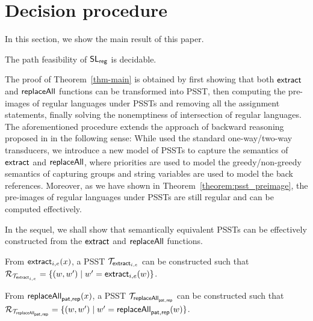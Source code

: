 
\section{Decision procedure} \label{sec:decision}

In this section, we  show the main result of this paper.

\begin{theorem}\label{thm-main}
The path feasibility of $\mathsf{SL}_{\sf reg}$ is decidable.
\end{theorem}

The proof of Theorem~\ref{thm-main} is obtained by first showing that both $\mathsf{extract}$ and $\mathsf{replaceAll}$ functions can be transformed into PSST, then computing the pre-images of regular languages under PSSTs and removing all the assignment statements, finally solving the nonemptiness of intersection of regular languages. The aforementioned procedure extends the approach of backward reasoning proposed in \cite{CCH+18,CHL+19} in the following sense: While \cite{CCH+18,CHL+19} used the standard one-way/two-way transducers, we introduce a new model of PSSTs to capture the semantics of $\mathsf{extract}$ and $\mathsf{replaceAll}$, where priorities are used to model the greedy/non-greedy semantics of capturing groups and string variables are used to model the back references. Moreover, as we have shown in Theorem~\ref{theorem:psst_preimage}, the pre-images of regular languages under PSSTs are still regular and can be computed effectively.

In the sequel, we shall show that semantically equivalent PSSTs can be effectively constructed from the $\mathsf{extract}$ and $\mathsf{replaceAll}$ functions. 

\begin{lemma}\label{lem-extract}
From $\mathsf{extract}_{i,e}(x)$, a PSST $\mathcal{T}_{\mathsf{extract}_{i,e}}$ can be constructed such that $\mathcal{R}_{\mathcal{T}_{\mathsf{extract}_{i,e}}} = \{(w, w') \mid w'= \mathsf{extract}_{i,e}(w)\}$.
\end{lemma}

\begin{lemma}\label{lem-replace}
From $\mathsf{replaceAll}_{\mathsf{pat}, \mathsf{rep}}(x)$, a PSST $\mathcal{T}_{\mathsf{replaceAll}_{\mathsf{pat}, \mathsf{rep}}}$ can be constructed such that $\mathcal{R}_{\mathcal{T}_{\mathsf{replaceAll}_{\mathsf{pat}, \mathsf{rep}}}} = \{(w, w') \mid w'= \mathsf{replaceAll}_{\mathsf{pat}, \mathsf{rep}}(w)\}$.
\end{lemma}

